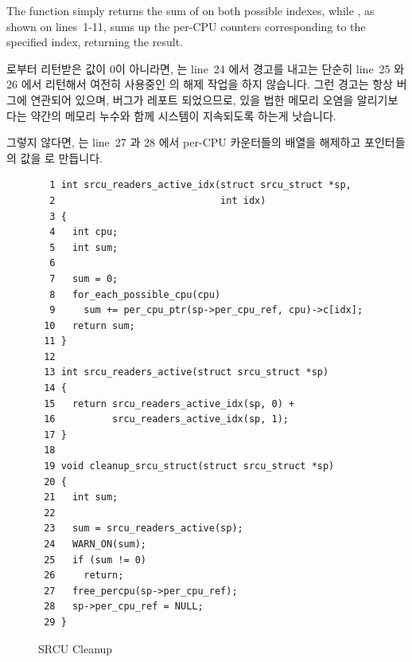 The  function simply returns the sum of
 on both possible indexes,
while , as shown on lines~1-11,
sums up the per-CPU counters corresponding to the specified index,
returning the result.
\fi

 로부터 리턴받은 값이 0이 아니라면,
 는 line~24 에서 경고를 내고는 단순히 line~25 와 26
에서 리턴해서 여전히 사용중인   의 해제 작업을 하지
않습니다.
그런 경고는 항상 버그에 연관되어 있으며, 버그가 레포트 되었으므로, 있을 법한
메모리 오염을 알리기보다는 약간의 메모리 누수와 함께 시스템이 지속되도록 하는게
낫습니다.

그렇지 않다면,  는 line~27 과 28 에서 per-CPU
카운터들의 배열을 해제하고 포인터들의 값을  로 만듭니다.

\begin{figure}[htbp]
{ \scriptsize
\begin{verbatim}
  1 int srcu_readers_active_idx(struct srcu_struct *sp,
  2                             int idx)
  3 {
  4   int cpu;
  5   int sum;
  6
  7   sum = 0;
  8   for_each_possible_cpu(cpu)
  9     sum += per_cpu_ptr(sp->per_cpu_ref, cpu)->c[idx];
 10   return sum;
 11 }
 12
 13 int srcu_readers_active(struct srcu_struct *sp)
 14 {
 15   return srcu_readers_active_idx(sp, 0) +
 16          srcu_readers_active_idx(sp, 1);
 17 }
 18
 19 void cleanup_srcu_struct(struct srcu_struct *sp)
 20 {
 21   int sum;
 22
 23   sum = srcu_readers_active(sp);
 24   WARN_ON(sum);
 25   if (sum != 0)
 26     return;
 27   free_percpu(sp->per_cpu_ref);
 28   sp->per_cpu_ref = NULL;
 29 }
\end{verbatim}
}
\caption{SRCU Cleanup}
\label{fig:app:rcuimpl:SRCU Cleanup}
\end{figure}

